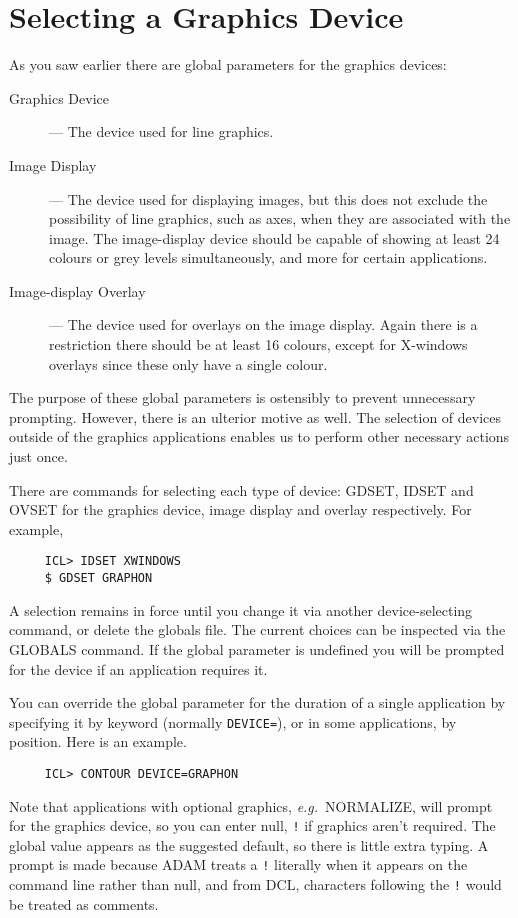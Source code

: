 \section{Selecting a Graphics Device}
\label{se:selgradev}
As you saw earlier there are global parameters for the graphics devices:
\begin{description}
\item [Graphics Device] --- The device used for line graphics.
\item [Image Display] --- The device used for displaying images, but this
does not exclude the possibility of line graphics, such as axes, when
they are associated with the image.  The image-display device should
be capable of showing at least 24 colours or grey levels simultaneously,
and more for certain applications.
\item [Image-display Overlay] --- The device used for overlays on the image
display.  Again there is a restriction there should be at least 16
colours, except for X-windows overlays since these only have a single
colour.
\end{description}
The purpose of these global parameters is ostensibly to prevent
unnecessary prompting. However, there is an ulterior motive as well. 
The selection of devices outside of the graphics applications enables
us to perform other necessary actions just once. 

There are commands for selecting each type of device: GDSET,
IDSET and OVSET for the graphics device, image display and
overlay respectively.  For example,

\small
\begin{verbatim}
     ICL> IDSET XWINDOWS
     $ GDSET GRAPHON
\end{verbatim}
\normalsize
A selection remains in force until you change it via another
device-selecting command, or delete the globals file.  The current
choices can be inspected via the GLOBALS command.   If the
global parameter is undefined you will be prompted for the
device if an application requires it.

You can override the global parameter for the duration of a single
application by specifying it by keyword (normally {\tt DEVICE=}), or in
some applications, by position.  Here is an example.

\small
\begin{verbatim}
     ICL> CONTOUR DEVICE=GRAPHON
\end{verbatim}
\normalsize

Note that applications with optional graphics, {\it e.g.}\ NORMALIZE,
will prompt for the graphics device, so you can enter null, {\tt !} if
graphics aren't required.  The global value appears as the suggested
default, so there is little extra typing. A prompt is made because
{\small ADAM} treats a {\tt !} literally when it appears on the command
line rather than null, and from {\small DCL}, characters following the
{\tt !} would be treated as comments.

